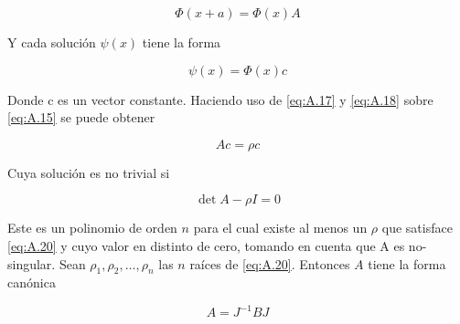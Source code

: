\begin{equation}\label{eq:A.17}
    \Phi(x+a)=\Phi(x)A
\end{equation}

Y cada solución $\psi(x)$ tiene la forma 

\begin{equation}\label{eq:A.18}
    \psi(x)=\Phi(x)c
\end{equation}

Donde c es un vector constante. Haciendo uso de \ref{eq:A.17} y \ref{eq:A.18} sobre \ref{eq:A.15} se puede obtener

\begin{equation}\label{eq:A.19}
    Ac=\rho c
\end{equation}

Cuya solución es no trivial si 

\begin{equation}\label{eq:A.20}
    \det{A-\rho I}=0
\end{equation}

Este es un polinomio de orden $n$ para el cual existe al menos un $\rho$ que satisface \ref{eq:A.20} y cuyo valor en distinto de cero, tomando en cuenta que A es no-singular. 
Sean $\rho_1,\rho_2,\dots,\rho_n$ las $n$ raíces de \ref{eq:A.20}. Entonces $A$ tiene la forma canónica

\begin{equation}\label{eq:A.21}
    A=J^{-1}BJ
\end{equation}


